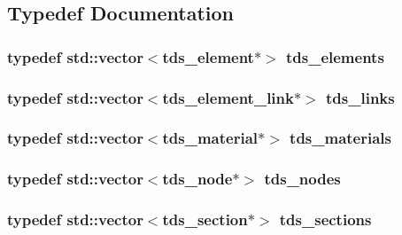\subsection{Typedef Documentation}
\subsubsection[{\texorpdfstring{tds\+\_\+elements}{tds_elements}}]{\setlength{\rightskip}{0pt plus 5cm}typedef std\+::vector$<${\bf tds\+\_\+element}$\ast$$>$ {\bf tds\+\_\+elements}}\hypertarget{tds__parts_8hh_af35ca3b18f7ed6e38a9bfb5639d5a23e}{}\label{tds__parts_8hh_af35ca3b18f7ed6e38a9bfb5639d5a23e}
\subsubsection[{\texorpdfstring{tds\+\_\+links}{tds_links}}]{\setlength{\rightskip}{0pt plus 5cm}typedef std\+::vector$<${\bf tds\+\_\+element\+\_\+link}$\ast$$>$ {\bf tds\+\_\+links}}\hypertarget{tds__parts_8hh_a5d3b1cd92297b3ee827cdf0fff431aef}{}\label{tds__parts_8hh_a5d3b1cd92297b3ee827cdf0fff431aef}
\subsubsection[{\texorpdfstring{tds\+\_\+materials}{tds_materials}}]{\setlength{\rightskip}{0pt plus 5cm}typedef std\+::vector$<${\bf tds\+\_\+material}$\ast$$>$ {\bf tds\+\_\+materials}}\hypertarget{tds__parts_8hh_a972ae401709b50fd79befb06dd952170}{}\label{tds__parts_8hh_a972ae401709b50fd79befb06dd952170}
\subsubsection[{\texorpdfstring{tds\+\_\+nodes}{tds_nodes}}]{\setlength{\rightskip}{0pt plus 5cm}typedef std\+::vector$<${\bf tds\+\_\+node}$\ast$$>$ {\bf tds\+\_\+nodes}}\hypertarget{tds__parts_8hh_ad445cf91d41fc0e37fcaf259adec00ef}{}\label{tds__parts_8hh_ad445cf91d41fc0e37fcaf259adec00ef}
\subsubsection[{\texorpdfstring{tds\+\_\+sections}{tds_sections}}]{\setlength{\rightskip}{0pt plus 5cm}typedef std\+::vector$<${\bf tds\+\_\+section}$\ast$$>$ {\bf tds\+\_\+sections}}\hypertarget{tds__parts_8hh_aef503d0ac251112b915fc3a8918962f2}{}\label{tds__parts_8hh_aef503d0ac251112b915fc3a8918962f2}
